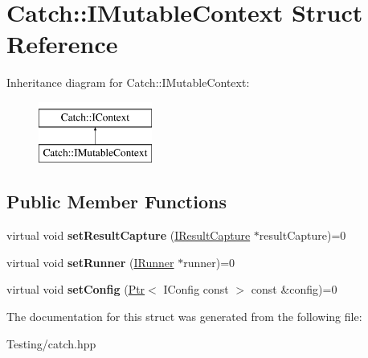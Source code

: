 \hypertarget{struct_catch_1_1_i_mutable_context}{\section{Catch\-:\-:I\-Mutable\-Context Struct Reference}
\label{struct_catch_1_1_i_mutable_context}
}
Inheritance diagram for Catch\-:\-:I\-Mutable\-Context\-:\begin{figure}[H]
\begin{center}
\leavevmode
\includegraphics[height=2.000000cm]{struct_catch_1_1_i_mutable_context}
\end{center}
\end{figure}
\subsection*{Public Member Functions}
\begin{DoxyCompactItemize}
\item 
\hypertarget{struct_catch_1_1_i_mutable_context_a4a80afd0525b7def21bee8d9b48f2d39}{virtual void {\bfseries set\-Result\-Capture} (\hyperlink{struct_catch_1_1_i_result_capture}{I\-Result\-Capture} $\ast$result\-Capture)=0}\label{struct_catch_1_1_i_mutable_context_a4a80afd0525b7def21bee8d9b48f2d39}

\item 
\hypertarget{struct_catch_1_1_i_mutable_context_af2e53b1dea4527a2587cff266a730f6e}{virtual void {\bfseries set\-Runner} (\hyperlink{struct_catch_1_1_i_runner}{I\-Runner} $\ast$runner)=0}\label{struct_catch_1_1_i_mutable_context_af2e53b1dea4527a2587cff266a730f6e}

\item 
\hypertarget{struct_catch_1_1_i_mutable_context_a04ae4f4219a481a7bf658d9fd445bc1d}{virtual void {\bfseries set\-Config} (\hyperlink{class_catch_1_1_ptr}{Ptr}$<$ I\-Config const  $>$ const \&config)=0}\label{struct_catch_1_1_i_mutable_context_a04ae4f4219a481a7bf658d9fd445bc1d}

\end{DoxyCompactItemize}


The documentation for this struct was generated from the following file\-:\begin{DoxyCompactItemize}
\item 
Testing/catch.\-hpp\end{DoxyCompactItemize}
